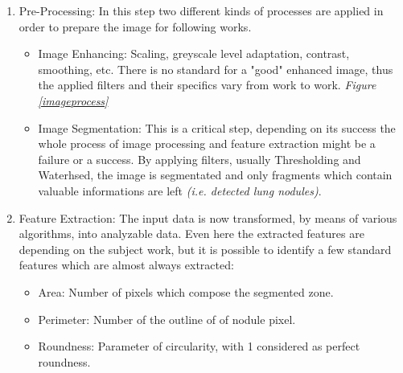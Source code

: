 \documentclass[../main.tex]{subfiles}
\begin{document}
\begin{enumerate}
	\item Pre-Processing: In this step two different kinds of processes are applied in order to prepare the image for following works.
	\begin{itemize}
		\item Image Enhancing: Scaling, greyscale level adaptation, contrast, smoothing, etc. There is no standard for a "good" enhanced image, thus the applied filters and their specifics vary from work to work. \textit{Figure \ref{imageprocess}}
		\item Image Segmentation: This is a critical step, depending on its success the whole process of image processing and feature extraction might be a failure or a success. By applying filters, usually Thresholding and Waterhsed, the image is segmentated and only fragments which contain valuable informations are left \textit{(i.e. detected lung nodules)}.
	\end{itemize}
	\item Feature Extraction: The input data is now transformed, by means of various algorithms, into analyzable data. Even here the extracted features are depending on the subject work, but it is possible to identify a few standard features which are almost always extracted:
	\begin{itemize}
		\item Area: Number of pixels which compose the segmented zone.
		\item Perimeter: Number of the outline of of nodule pixel.
		\item Roundness: Parameter of circularity, with 1 considered as perfect roundness.
	\end{itemize}
\end{enumerate}
\end{document}

